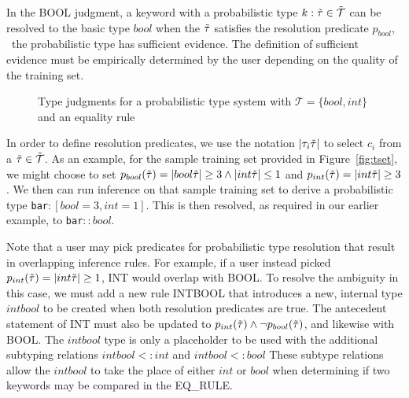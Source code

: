 In the {\scriptsize BOOL} judgment, a keyword with a probabilistic type $k : \tilde{\tau} \in \tilde{\mathcal{T}}$ can be resolved to the basic type $bool$ when the $\tilde{\tau}$ satisfies the resolution predicate $p_{bool}$, \ie\ the probabilistic type has sufficient evidence.
The definition of sufficient evidence must be empirically determined by the user depending on the quality of the training set.

{
\setlength{\abovecaptionskip}{-.05pt}
\setlength{\belowcaptionskip}{-15pt}
\begin{figure}
\caption{Type judgments for a probabilistic type system with $\mathcal{T} = \{bool,int\}$ and an equality rule}
\label{fig:ptypes}
\end{figure}
}

In order to define resolution predicates, we use the notation $|\tau_i\tilde{\tau}|$ to select $c_i$ from a $\tilde{\tau} \in \tilde{\mathcal{T}}$.
As an example, for the sample training set provided in Figure~\ref{fig:tset}, we might choose to set $p_{bool}(\tilde{\tau})= |bool\tilde{\tau}| \geq 3 \land |int\tilde{\tau}| \leq 1$ and $p_{int}(\tilde{\tau})= |int\tilde{\tau}| \geq 3$.
We then can run inference on that sample training set to derive a probabilistic type \texttt{bar}$:[bool=3,int=1]$.
This is then resolved, as required in our earlier example, to \texttt{bar}$::bool$.
 
Note that a user may pick predicates for probabilistic type resolution that result in overlapping inference rules.
For example, if a user instead picked $p_{int}(\tilde{\tau})= |int\tilde{\tau}| \geq 1$, {\scriptsize INT} would overlap with {\scriptsize BOOL}.
To resolve the ambiguity in this case, we must add a new rule {\scriptsize INTBOOL} that introduces a new, internal type $intbool$ to be created when both resolution predicates are true.
The antecedent statement of {\scriptsize INT} must also be updated to $p_{int}(\tilde{\tau}) \land \neg p_{bool}(\tilde{\tau})$, and likewise with {\scriptsize BOOL}.
The $intbool$ type is only a placeholder to be used with the additional subtyping relations $intbool <: int$ and $intbool <: bool$
These subtype relations allow the $intbool$ to take the place of either $int$ or $bool$ when determining if two keywords may be compared in the {\scriptsize EQ\_RULE}.

